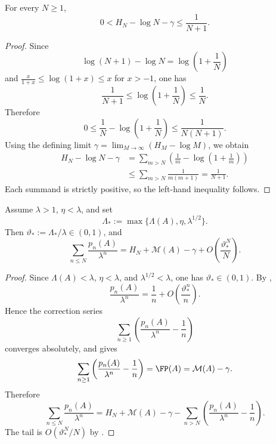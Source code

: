 \begin{lemma}
  \label{lem:harmonic-log-remainder}
  For every \(N\ge 1\),
  \[
    0
    <
    H_N-\log N-\gamma
    \le
    \frac{1}{N+1}.
  \]
\end{lemma}

\begin{proof}
  Since
  \[
    \log(N+1)-\log N
    =
    \log\!\left(1+\frac{1}{N}\right)
  \]
  and \(\frac{x}{1+x}\le \log(1+x)\le x\) for \(x>-1\), one has
  \[
    \frac{1}{N+1}
    \le
    \log\!\left(1+\frac{1}{N}\right)
    \le
    \frac{1}{N}.
  \]
  Therefore
  \[
    0
    \le
    \frac{1}{N}-\log\!\left(1+\frac{1}{N}\right)
    \le
    \frac{1}{N(N+1)}.
  \]
  Using the defining limit
  \(\gamma=\lim_{M\to\infty}(H_M-\log M)\), we obtain
  \begin{align*}
    H_N-\log N-\gamma
    &=
    \sum_{m>N}
      \left(
        \frac{1}{m}-\log\!\left(1+\frac{1}{m}\right)
      \right) \\
    &\le
    \sum_{m>N}\frac{1}{m(m+1)}
    =
    \frac{1}{N+1}.
  \end{align*}
  Each summand is strictly positive, so the left-hand inequality follows.
\end{proof}

\begin{lemma}
  \label{lem:perron-channel-contribution}
  Assume \(\lambda>1\), \(\eta<\lambda\), and set
  \[
    \Lambda_*:=\max\{\Lambda(A),\eta,\lambda^{1/2}\}.
  \]
  Then \(\vartheta_*:=\Lambda_*/\lambda\in(0,1)\), and
  \[
    \sum_{n\le N}\frac{p_n(A)}{\lambda^n}
    =
    H_N+\mathcal M(A)-\gamma
    +O\!\left(\frac{\vartheta_*^N}{N}\right).
  \]
\end{lemma}

\begin{proof}
  Since \(\Lambda(A)<\lambda\), \(\eta<\lambda\), and
  \(\lambda^{1/2}<\lambda\), one has \(\vartheta_*\in(0,1)\). By
  ,
  \[
    \frac{p_n(A)}{\lambda^n}
    =
    \frac{1}{n}
    +O\!\left(\frac{\vartheta_*^n}{n}\right).
  \]
  Hence the correction series
  \[
    \sum_{n\ge 1}\left(\frac{p_n(A)}{\lambda^n}-\frac{1}{n}\right)
  \]
  converges absolutely, and  gives
  \[
    \sum_{n\ge 1}\left(\frac{p_n(A)}{\lambda^n}-\frac{1}{n}\right)
    =
    \FP(A)
    =
    \mathcal M(A)-\gamma.
  \]
  Therefore
  \[
    \sum_{n\le N}\frac{p_n(A)}{\lambda^n}
    =
    H_N+\mathcal M(A)-\gamma
    -\sum_{n>N}\left(\frac{p_n(A)}{\lambda^n}-\frac{1}{n}\right).
  \]
  The tail is \(O(\vartheta_*^N/N)\) by
  .
\end{proof}
